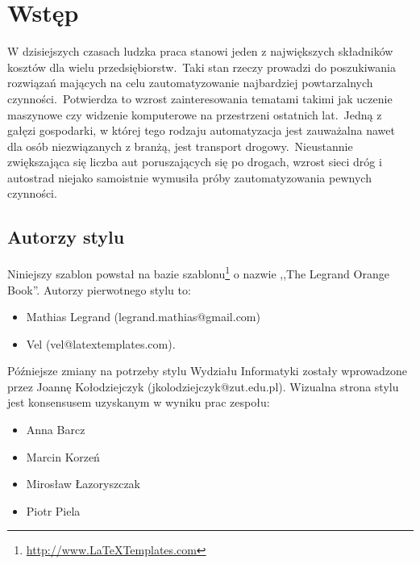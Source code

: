 %


\chapter{Wstęp}
\label{rozdzial1}

W dzisiejszych czasach ludzka praca stanowi jeden z największych składników kosztów dla wielu przedsiębiorstw.\ Taki stan rzeczy prowadzi do poszukiwania rozwiązań mających na celu zautomatyzowanie najbardziej powtarzalnych czynności.\ Potwierdza to wzrost zainteresowania tematami takimi jak uczenie maszynowe czy widzenie komputerowe na przestrzeni ostatnich lat.\ Jedną z gałęzi gospodarki, w której tego rodzaju automatyzacja jest zauważalna nawet dla osób niezwiązanych z branżą, jest transport drogowy.\ Nieustannie zwiększająca się liczba aut poruszających się po drogach, wzrost sieci dróg i autostrad niejako samoistnie wymusiła próby zautomatyzowania pewnych czynności.


\section{Autorzy stylu}

Niniejszy szablon powstał na bazie szablonu\footnote{\url{http://www.LaTeXTemplates.com}} o nazwie ,,The Legrand Orange Book''.
Autorzy pierwotnego stylu to:
\begin{itemize}
    \item Mathias Legrand (legrand.mathias@gmail.com)
    \item Vel (vel@latextemplates.com).
\end{itemize}

Późniejsze zmiany na potrzeby stylu Wydziału Informatyki zostały wprowadzone przez Joannę Kołodziejczyk (jkolodziejczyk@zut.edu.pl). Wizualna strona stylu jest konsensusem uzyskanym w wyniku prac zespołu:
\begin{itemize}
    \item Anna Barcz
    \item Marcin Korzeń
    \item Mirosław Łazoryszczak
    \item Piotr Piela
\end{itemize}

